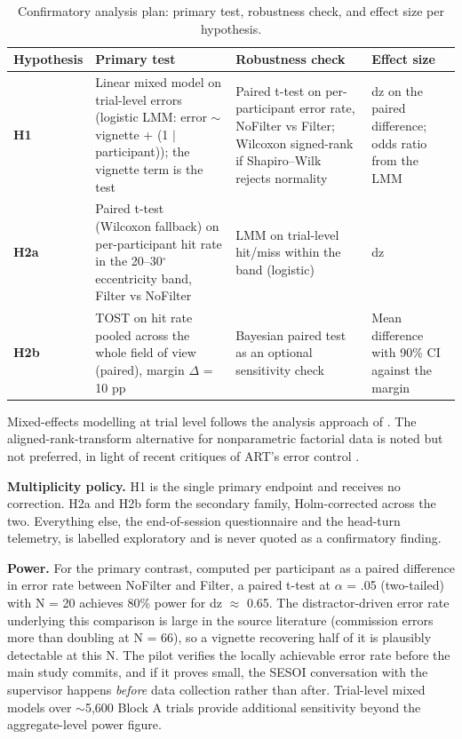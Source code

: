 \begin{longtable}{p{}|p{}|p{}|p{}}
\caption{Confirmatory analysis plan: primary test, robustness check, and effect size per hypothesis.}\\
\hline
\textbf{Hypothesis} & \textbf{Primary test} & \textbf{Robustness check} & \textbf{Effect size} \\
\hline
\endhead
\hline
\textbf{H1} & Linear mixed model on trial-level errors (logistic LMM: error $\sim$ vignette + (1 $\mid$ participant)); the vignette term is the test & Paired t-test on per-participant error rate, NoFilter vs Filter; Wilcoxon signed-rank if Shapiro–Wilk rejects normality & dz on the paired difference; odds ratio from the LMM \\
\textbf{H2a} & Paired t-test (Wilcoxon fallback) on per-participant hit rate in the 20–30$^{\circ}$ eccentricity band, Filter vs NoFilter & LMM on trial-level hit/miss within the band (logistic) & dz \\
\textbf{H2b} & TOST on hit rate pooled across the whole field of view (paired), margin $\Delta$ = 10 pp \citep{lakens2017} & Bayesian paired test as an optional sensitivity check & Mean difference with 90\% CI against the margin \\
\hline
\end{longtable}

Mixed-effects modelling at trial level follows the analysis approach of \citet{mclaughlin2025}. The
aligned-rank-transform alternative for nonparametric factorial data \citep{wobbrock2011} is noted
but not preferred, in light of recent critiques of ART's error control \citep{tsandilas2024}.

\textbf{Multiplicity policy.} H1 is the single primary endpoint and receives no correction. H2a and H2b
form the secondary family, Holm-corrected across the two. Everything else, the end-of-session
questionnaire and the head-turn telemetry, is labelled exploratory and is never quoted as a
confirmatory finding.

\textbf{Power.} For the primary contrast, computed per participant as a paired difference in error rate
between NoFilter and Filter, a paired t-test at $\alpha$ = .05 (two-tailed) with N = 20 achieves 80\%
power for dz $\approx$ 0.65. The distractor-driven error rate underlying this comparison is large in the
source literature (commission errors more than doubling at N = 66), so a vignette recovering half of
it is plausibly detectable at this N. The pilot verifies the locally achievable error rate before the
main study commits, and if it proves small, the SESOI conversation with the supervisor happens
\textit{before} data collection rather than after. Trial-level mixed models over $\sim$5,600 Block A
trials provide additional sensitivity beyond the aggregate-level power figure.


